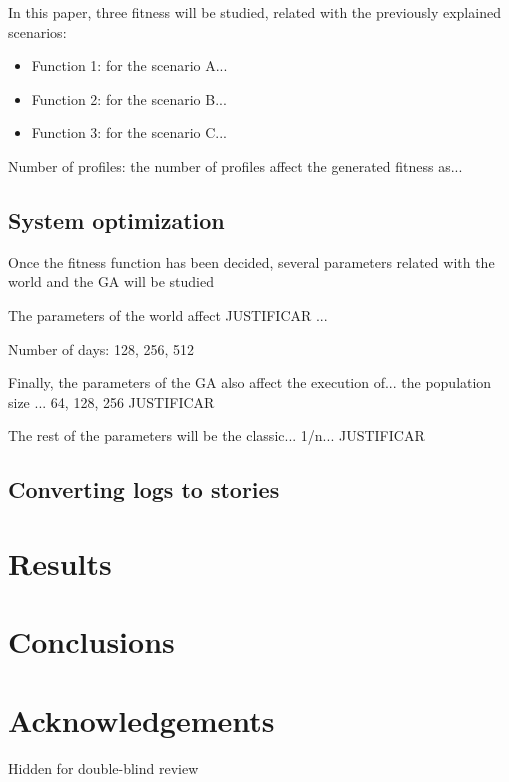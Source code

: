 \documentclass[runningheads,a4paper]{llncs}
\begin{document}
In this paper, three fitness will be studied, related with the previously explained scenarios:
\begin{itemize}
\item Function 1: for the scenario A...
\item Function 2: for the scenario B...
\item Function 3: for the scenario C...
\end{itemize}

Number of profiles: the number of profiles affect the generated fitness as...

\subsection{System optimization}

Once the fitness function has been decided, several parameters related with the world and the GA will be studied

The parameters of the world affect  JUSTIFICAR ...


Number of days: 128, 256, 512


Finally, the parameters of the GA also affect the execution of... the population size ... 64, 128, 256 JUSTIFICAR

The rest of the parameters will be the classic... 1/n... JUSTIFICAR 


\subsection{Converting logs to stories}

\section{Results}
\label{sec:res}

\section{Conclusions}

\section*{Acknowledgements}

Hidden for double-blind review



\end{document}
